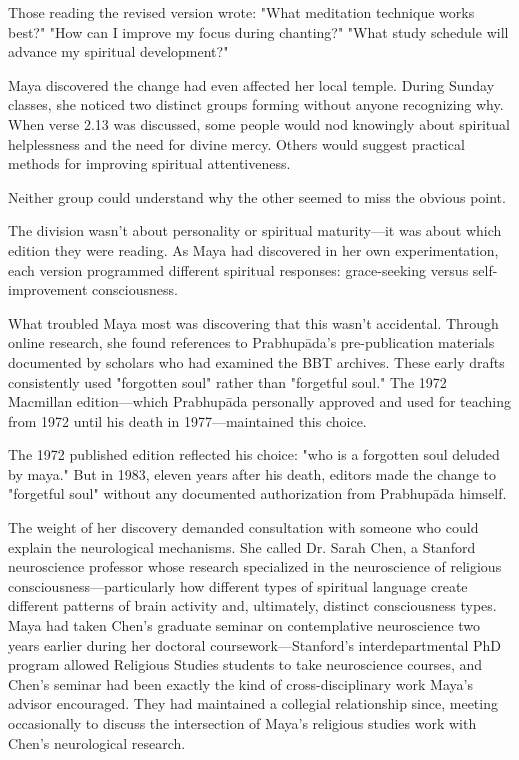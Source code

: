 \documentclass[12pt,twoside]{book}
\begin{document}
Those reading the revised version wrote: "What meditation technique works best?" "How can I improve my focus during chanting?" "What study schedule will advance my spiritual development?"

Maya discovered the change had even affected her local temple. During Sunday classes, she noticed two distinct groups forming without anyone recognizing why. When verse 2.13 was discussed, some people would nod knowingly about spiritual helplessness and the need for divine mercy. Others would suggest practical methods for improving spiritual attentiveness.

Neither group could understand why the other seemed to miss the obvious point.

The division wasn't about personality or spiritual maturity—it was about which edition they were reading. As Maya had discovered in her own experimentation, each version programmed different spiritual responses: grace-seeking versus self-improvement consciousness.

What troubled Maya most was discovering that this wasn't accidental. Through online research, she found references to Prabhupāda's pre-publication materials documented by scholars who had examined the BBT archives. These early drafts consistently used "forgotten soul" rather than "forgetful soul." The 1972 Macmillan edition—which Prabhupāda personally approved and used for teaching from 1972 until his death in 1977—maintained this choice.

The 1972 published edition reflected his choice: "who is a forgotten soul deluded by maya." But in 1983, eleven years after his death, editors made the change to "forgetful soul" without any documented authorization from Prabhupāda himself.

The weight of her discovery demanded consultation with someone who could explain the neurological mechanisms. She called Dr. Sarah Chen, a Stanford neuroscience professor whose research specialized in the neuroscience of religious consciousness—particularly how different types of spiritual language create different patterns of brain activity and, ultimately, distinct consciousness types. Maya had taken Chen's graduate seminar on contemplative neuroscience two years earlier during her doctoral coursework—Stanford's interdepartmental PhD program allowed Religious Studies students to take neuroscience courses, and Chen's seminar had been exactly the kind of cross-disciplinary work Maya's advisor encouraged. They had maintained a collegial relationship since, meeting occasionally to discuss the intersection of Maya's religious studies work with Chen's neurological research.
\end{document}

